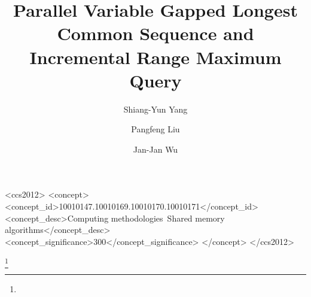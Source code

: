 \documentclass[format=acmsmall, review=false, screen=true]{acmart}
\newcommand*{\PartialPath}{../partial}
\begin{document}
\title[Parallel VGLCS and IRMQ]{Parallel Variable Gapped Longest Common Sequence and Incremental Range Maximum Query}  
\author{Shiang-Yun Yang}
\author{Pangfeng Liu}
\author{Jan-Jan Wu}



%
%
\begin{CCSXML}
<ccs2012>
<concept>
<concept_id>10010147.10010169.10010170.10010171</concept_id>
<concept_desc>Computing methodologies~Shared memory algorithms</concept_desc>
<concept_significance>300</concept_significance>
</concept>
</ccs2012>
\end{CCSXML}


%
%






\thanks{}


\maketitle

\renewcommand{\shortauthors}{S.Y. Yang et al.}



















\nocite{Rahman2006AlgorithmsFC}
\nocite{Peng2011TheLC}
\nocite{Hasan2010CacheOA}
\nocite{Gabow1983ALA}
\nocite{Fischer2007ANS}



\end{document}
